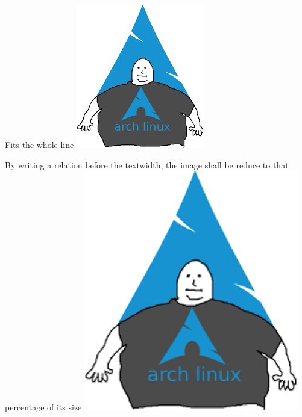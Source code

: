 \documentclass{article}
\begin{document}
\begin{center}
Fits the whole line
\includegraphics[width=\textwidth]{linux.png}
\end{center}

\begin{center}
By writing a relation before the textwidth, the image shall be reduce to that
percentage of its size
\includegraphics[width=0.7\textwidth]{linux.png}
\end{center}
\end{document}
